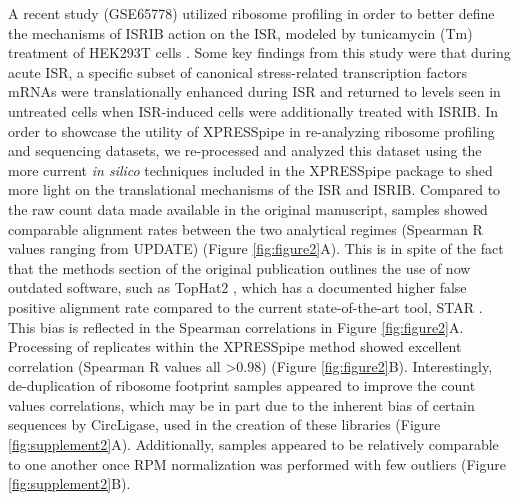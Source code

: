 \documentclass[11pt, a4paper, oneside]{article}
\begin{document}
A recent study (GSE65778) utilized ribosome profiling in order to better define the mechanisms of ISRIB action on the ISR, modeled by tunicamycin (Tm) treatment of HEK293T cells \cite{isrib_riboseq}. Some key findings from this study were that during acute ISR, a specific subset of canonical stress-related transcription factors mRNAs were translationally enhanced during ISR and returned to levels seen in untreated cells when ISR-induced cells were additionally treated with ISRIB. In order to showcase the utility of XPRESSpipe in re-analyzing ribosome profiling and sequencing datasets, we re-processed and analyzed this dataset using the more current \textit{in silico} techniques included in the XPRESSpipe package to shed more light on the translational mechanisms of the ISR and ISRIB. Compared to the raw count data made available in the original manuscript, samples showed comparable alignment rates between the two analytical regimes (Spearman R values ranging from UPDATE) (Figure \ref{fig:figure2}A). This is in spite of the fact that the methods section of the original publication outlines the use of now outdated software, such as TopHat2 \cite{tophat2}, which has a documented higher false positive alignment rate compared to the current state-of-the-art tool, STAR \cite{alignment_benchmark, star}. This bias is reflected in the Spearman correlations in Figure \ref{fig:figure2}A. Processing of replicates within the XPRESSpipe method showed excellent correlation (Spearman R values all \textgreater 0.98) (Figure \ref{fig:figure2}B). Interestingly, de-duplication of ribosome footprint samples appeared to improve the count values correlations, which may be in part due to the inherent bias of certain sequences by CircLigase, used in the creation of these libraries \cite{circligase_bias, isrib_riboseq} (Figure \ref{fig:supplement2}A). Additionally, samples appeared to be relatively comparable to one another once RPM normalization was performed with few outliers (Figure \ref{fig:supplement2}B). \par
\end{document}
